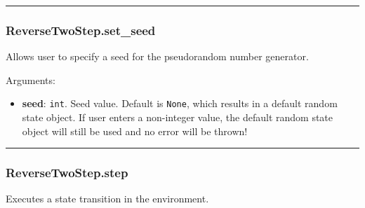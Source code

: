 \begin{Shaded}
\begin{Highlighting}[]
\OperatorTok{=}
\end{Highlighting}
\end{Shaded}

\begin{center}\rule{0.5\linewidth}{\linethickness}\end{center}

\subsubsection{ReverseTwoStep.set\_seed}\label{reversetwostep.set_seed}

\begin{Shaded}
\begin{Highlighting}[]
\OperatorTok{=}\NormalTok{)}
\end{Highlighting}
\end{Shaded}

Allows user to specify a seed for the pseudorandom number generator.

Arguments:

\begin{itemize}
\tightlist
\item
  \textbf{seed}: \texttt{int}. Seed value. Default is \texttt{None},
  which results in a default random state object. If user enters a
  non-integer value, the default random state object will still be used
  and no error will be thrown!
\end{itemize}

\begin{center}\rule{0.5\linewidth}{\linethickness}\end{center}

\subsubsection{ReverseTwoStep.step}\label{reversetwostep.step}

\begin{Shaded}
\begin{Highlighting}[]
\end{Highlighting}
\end{Shaded}

Executes a state transition in the environment.

